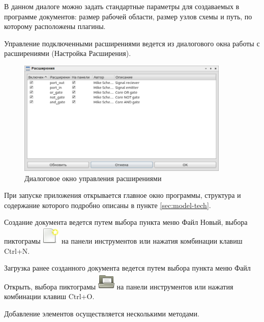 В данном диалоге можно задать стандартные параметры для создаваемых в программе документов: размер рабочей области, размер узлов схемы и путь, по которому расположены плагины.

Управление подключенными расширениями ведется из диалогового окна работы с расширениями (Настройка \rarr Расширения).
\begin{figure}[H]
  \centering
  \includegraphics[width=0.9\textwidth]{gui/plugins.png}
  \caption{Диалоговое окно управления расширениями}
\end{figure}


При запуске приложения открывается главное окно программы, структура и содержание которого подробно описаны в пункте \ref{sec:model-tech}.

Создание документа ведется путем выбора пункта меню Файл \rarr Новый, выбора пиктограмы \includegraphics[scale=0.5]{gui/icons/file-new.png} на панели инструментов или нажатия комбинации клавиш Ctrl+N.

Загрузка ранее созданного документа ведется путем выбора пункта меню Файл \rarr Открыть, выбора пиктограмы \includegraphics[scale=0.5]{gui/icons/file-open.png} на панели инструментов или нажатия комбинации клавиш Ctrl+O.

Добавление элементов осуществляется несколькими методами.

